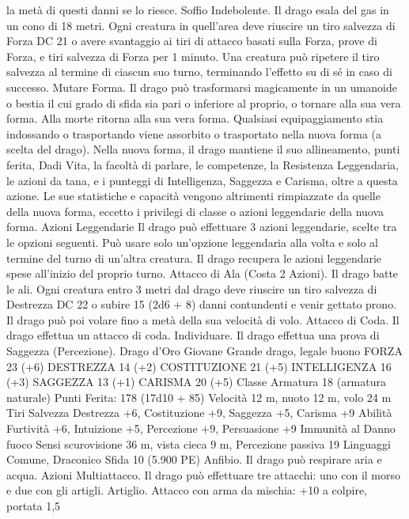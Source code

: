 \begin{multicols}{2}
la metà di questi danni se lo riesce.
Soffio Indebolente. Il drago esala del gas in un cono di 18 metri. Ogni
creatura in quell’area deve riuscire un tiro salvezza di Forza DC 21 o
avere svantaggio ai tiri di attacco basati sulla Forza, prove di Forza, e
tiri salvezza di Forza per 1 minuto. Una creatura può ripetere il tiro
salvezza al termine di ciascun suo turno, terminando l’effetto su di sé
in caso di successo.
Mutare Forma. Il drago può trasformarsi magicamente in un
umanoide o bestia il cui grado di sfida sia pari o inferiore al proprio,
o tornare alla sua vera forma. Alla morte ritorna alla sua vera forma.
Qualsiasi equipaggiamento stia indossando o trasportando viene
assorbito o trasportato nella nuova forma (a scelta del drago).
Nella nuova forma, il drago mantiene il suo allineamento, punti
ferita, Dadi Vita, la facoltà di parlare, le competenze, la Resistenza
Leggendaria, le azioni da tana, e i punteggi di Intelligenza, Saggezza
e Carisma, oltre a questa azione. Le sue statistiche e capacità
vengono altrimenti rimpiazzate da quelle della nuova forma, eccetto i
privilegi di classe o azioni leggendarie della nuova forma.
Azioni Leggendarie
Il drago può effettuare 3 azioni leggendarie, scelte tra le opzioni
seguenti. Può usare solo un’opzione leggendaria alla volta e solo
al termine del turno di un’altra creatura. Il drago recupera le
azioni leggendarie spese all’inizio del proprio turno.
Attacco di Ala (Costa 2 Azioni). Il drago batte le ali. Ogni
creatura entro 3 metri dal drago deve riuscire un tiro salvezza di
Destrezza DC 22 o subire 15 (2d6 + 8) danni contundenti e venir
gettato prono. Il drago può poi volare fino a metà della sua
velocità di volo.
Attacco di Coda. Il drago effettua un attacco di coda.
Individuare. Il drago effettua una prova di Saggezza
(Percezione).
Drago d’Oro Giovane
Grande drago, legale buono
FORZA 23 (+6)
DESTREZZA 14 (+2)
COSTITUZIONE 21 (+5)
INTELLIGENZA 16 (+3)
SAGGEZZA 13 (+1)
CARISMA 20 (+5)
Classe Armatura 18 (armatura naturale)
\hspace*{0pt}\hfill{Punti Ferita}: 178 (17d10 + 85)
Velocità 12 m, nuoto 12 m, volo 24 m
Tiri Salvezza Destrezza +6, Costituzione +9, Saggezza +5,
Carisma +9
Abilità Furtività +6, Intuizione +5, Percezione +9, Persuasione +9
Immunità al Danno fuoco
Sensi scurovisione 36 m, vista cieca 9 m, Percezione passiva 19
Linguaggi Comune, Draconico
Sfida 10 (5.900 PE)
Anfibio. Il drago può respirare aria e acqua.
Azioni
Multiattacco. Il drago può effettuare tre attacchi: uno con il
morso e due con gli artigli.
Artiglio. Attacco con arma da mischia: +10 a colpire, portata 1,5

\end{multicols}

